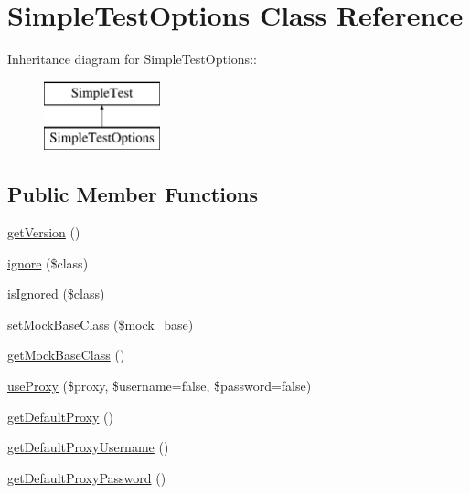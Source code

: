 \hypertarget{class_simple_test_options}{
\section{SimpleTestOptions Class Reference}
\label{class_simple_test_options}
}
Inheritance diagram for SimpleTestOptions::\begin{figure}[H]
\begin{center}
\leavevmode
\includegraphics[height=2cm]{class_simple_test_options}
\end{center}
\end{figure}
\subsection*{Public Member Functions}
\begin{DoxyCompactItemize}
\item 
\hyperlink{class_simple_test_options_a187d2d7c509d83c6b25e6dcc0e2f8a1e}{getVersion} ()
\item 
\hyperlink{class_simple_test_options_af46d33a1d67a45e554dce91b44d78aed}{ignore} (\$class)
\item 
\hyperlink{class_simple_test_options_a5a043e7e1dd2070601d53a5282f8787e}{isIgnored} (\$class)
\item 
\hyperlink{class_simple_test_options_abd99206b992d90ce1de9edbf4efceabb}{setMockBaseClass} (\$mock\_\-base)
\item 
\hyperlink{class_simple_test_options_a9059697594290ad1e01e7cf5d2e6237c}{getMockBaseClass} ()
\item 
\hyperlink{class_simple_test_options_a6d722d3083d23b8ad3a59813aba88bb4}{useProxy} (\$proxy, \$username=false, \$password=false)
\item 
\hyperlink{class_simple_test_options_abc355e97139c010dce4d0fbe181a1cfe}{getDefaultProxy} ()
\item 
\hyperlink{class_simple_test_options_a5f3b3d362318bcc9fb3da67c25229dde}{getDefaultProxyUsername} ()
\item 
\hyperlink{class_simple_test_options_ac0c29d1f79a425dc7053d9269b63f1f6}{getDefaultProxyPassword} ()
\end{DoxyCompactItemize}


